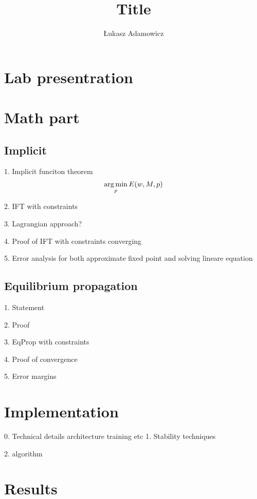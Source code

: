 \documentclass[a4paper,10pt]{report}
\title{Title}
\author{Łukasz Adamowicz}
\begin{document}
\maketitle

\begin{abstract}
\end{abstract}



\section{ Lab presentration}

 \section{Math part}

 \subsection{Implicit}
1. Implicit funciton theorem
\[\operatorname*{arg\,min}_p E(w,M,p)\]

2. IFT with constraints

3. Lagrangian approach?

4. Proof of IFT with constraints converging

5. Error analysis for both approximate fixed point and solving lineare equation
\subsection{ Equilibrium propagation}

1. Statement

2. Proof

3. EqProp with constraints

4. Proof of convergence

5. Error margins
\section{ Implementation}
0. Technical details
    architecture
    training
    etc
1. Stability techniques

2. algorithm
\section{Results}
\end{document}
